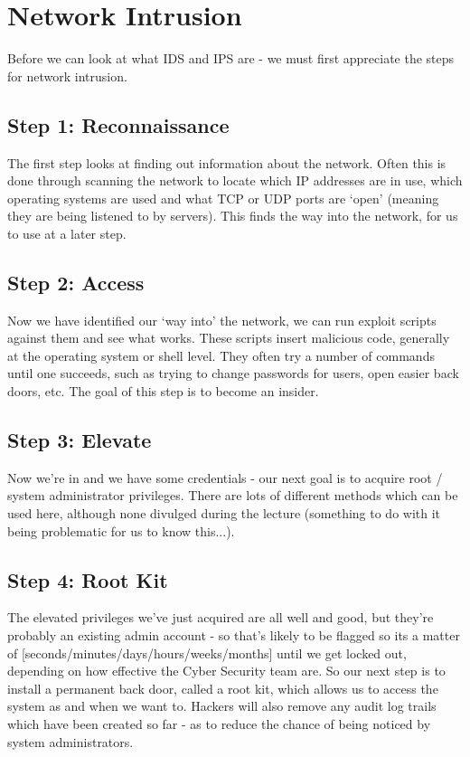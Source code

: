 
\section{Network Intrusion}
Before we can look at what IDS and IPS are - we must first appreciate the steps for network intrusion.

\subsection{Step 1: Reconnaissance}
The first step looks at finding out information about the network. Often this is done through scanning the network to locate which IP addresses are in use, which operating systems are used and what TCP or UDP ports are `open' (meaning they are being listened to by servers). This finds the way into the network, for us to use at a later step.

\subsection{Step 2: Access}
Now we have identified our `way into' the network, we can run exploit scripts against them and see what works. These scripts insert malicious code, generally at the operating system or shell level. They often try a number of commands until one succeeds, such as trying to change passwords for users, open easier back doors, etc. The goal of this step is to become an insider.

\subsection{Step 3: Elevate}
Now we're in and we have some credentials - our next goal is to acquire root / system administrator privileges. There are lots of different methods which can be used here, although none divulged during the lecture (something to do with it being problematic for us to know this...). 

\subsection{Step 4: Root Kit}
The elevated privileges we've just acquired are all well and good, but they're probably an existing admin account - so that's likely to be flagged so its a matter of [seconds/minutes/days/hours/weeks/months] until we get locked out, depending on how effective the Cyber Security team are. So our next step is to install a permanent back door, called a root kit, which allows us to access the system as and when we want to. Hackers will also remove any audit log trails which have been created so far - as to reduce the chance of being noticed by system administrators. 

